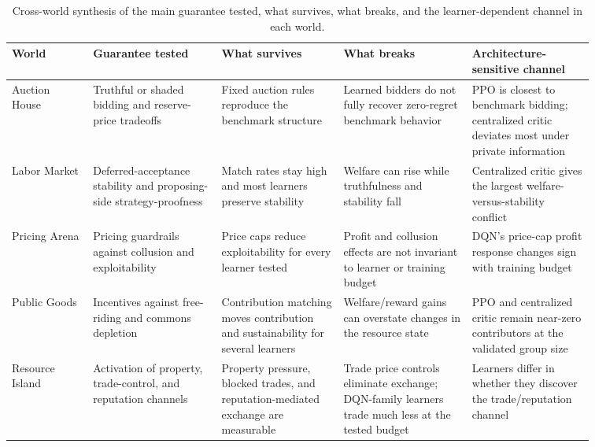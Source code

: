 \documentclass[11pt]{article}
\begin{document}
\begin{table}[h]
\centering
\scriptsize
\setlength{\tabcolsep}{3pt}
\begin{tabular}{>{\raggedright\arraybackslash}p{0.12\linewidth}>{\raggedright\arraybackslash}p{0.19\linewidth}>{\raggedright\arraybackslash}p{0.18\linewidth}>{\raggedright\arraybackslash}p{0.19\linewidth}>{\raggedright\arraybackslash}p{0.18\linewidth}}
\toprule
World & Guarantee tested & What survives & What breaks & Architecture-sensitive channel \\
\midrule
Auction House & Truthful or shaded bidding and reserve-price tradeoffs & Fixed auction rules reproduce the benchmark structure & Learned bidders do not fully recover zero-regret benchmark behavior & PPO is closest to benchmark bidding; centralized critic deviates most under private information \\
Labor Market & Deferred-acceptance stability and proposing-side strategy-proofness & Match rates stay high and most learners preserve stability & Welfare can rise while truthfulness and stability fall & Centralized critic gives the largest welfare-versus-stability conflict \\
Pricing Arena & Pricing guardrails against collusion and exploitability & Price caps reduce exploitability for every learner tested & Profit and collusion effects are not invariant to learner or training budget & DQN's price-cap profit response changes sign with training budget \\
Public Goods & Incentives against free-riding and commons depletion & Contribution matching moves contribution and sustainability for several learners & Welfare/reward gains can overstate changes in the resource state & PPO and centralized critic remain near-zero contributors at the validated group size \\
Resource Island & Activation of property, trade-control, and reputation channels & Property pressure, blocked trades, and reputation-mediated exchange are measurable & Trade price controls eliminate exchange; DQN-family learners trade much less at the tested budget & Learners differ in whether they discover the trade/reputation channel \\
\bottomrule
\end{tabular}
\normalsize
\caption{Cross-world synthesis of the main guarantee tested, what survives, what breaks, and the learner-dependent channel in each world.}
\label{tab:cross-world-synthesis}
\end{table}
\end{document}
